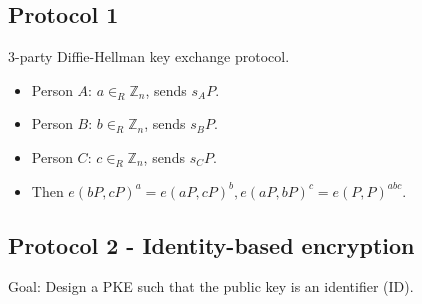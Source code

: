\documentclass[11pt]{article}
\theoremstyle{definition}
\theoremstyle{proof}
\begin{document}
\subsection{Protocol 1}

3-party Diffie-Hellman key exchange protocol.

\begin{itemize}
	\item Person $A$: $a \in_R \mathbb{Z}_n$, sends $s_AP$.
	\item Person $B$: $b \in_R \mathbb{Z}_n$, sends $s_BP$.
	\item Person $C$: $c \in_R \mathbb{Z}_n$, sends $s_CP$.
	\item Then $e(bP, cP)^a = e(aP, cP)^b, e(aP, bP)^c = e(P, P)^{abc}$.
\end{itemize}

\subsection{Protocol 2 - Identity-based encryption}

Goal: Design a PKE such that the public key is an identifier (ID).
\end{document}
